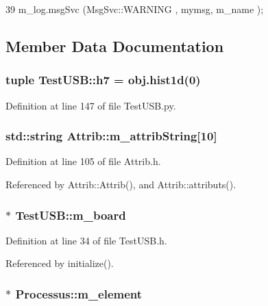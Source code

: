 \begin{DoxyCode}
39 { m_log.msgSvc (MsgSvc::WARNING , mymsg, m_name ); }
\end{DoxyCode}


\subsection{Member Data Documentation}
\hypertarget{classTestUSB_a7ac7e10c72450ba4c5764cefbaec6c4b}{
\subsubsection[{h7}]{\setlength{\rightskip}{0pt plus 5cm}tuple {\bf TestUSB::h7} = obj.hist1d(0)}}
\label{classTestUSB_a7ac7e10c72450ba4c5764cefbaec6c4b}


Definition at line 147 of file TestUSB.py.\hypertarget{classAttrib_a3414521d7a82476e874b25a5407b5e63}{
\subsubsection[{m\_\-attribString}]{\setlength{\rightskip}{0pt plus 5cm}std::string {\bf Attrib::m\_\-attribString}\mbox{[}10\mbox{]}}}
\label{classAttrib_a3414521d7a82476e874b25a5407b5e63}


Definition at line 105 of file Attrib.h.

Referenced by Attrib::Attrib(), and Attrib::attributs().\hypertarget{classTestUSB_ab4a5317f74feb30410d4c1ad75ad192c}{
\subsubsection[{m\_\-board}]{$\ast$ {\bf TestUSB::m\_\-board}}}
\label{classTestUSB_ab4a5317f74feb30410d4c1ad75ad192c}


Definition at line 34 of file TestUSB.h.

Referenced by initialize().\hypertarget{classProcessus_aa9d24d53c3e52f36786cabb5d8e296e7}{
\subsubsection[{m\_\-element}]{$\ast$ {\bf Processus::m\_\-element}}}
\label{classProcessus_aa9d24d53c3e52f36786cabb5d8e296e7}


